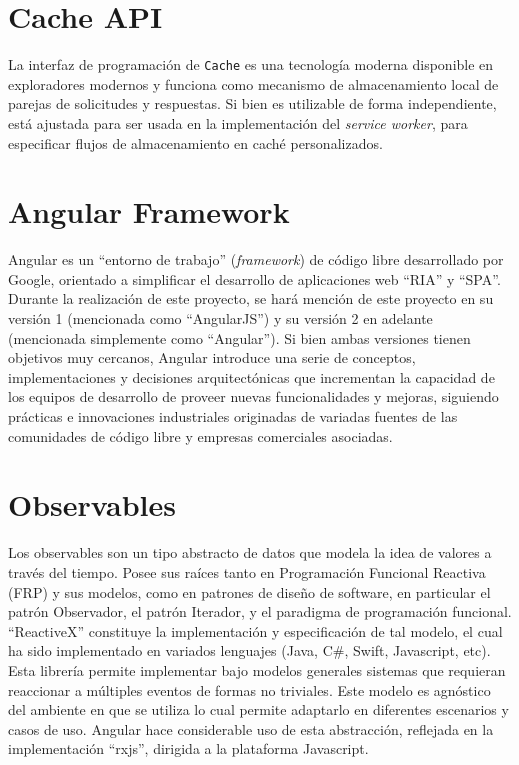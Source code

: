 \section{Cache API}

La interfaz de programación de \texttt{Cache} es una tecnología moderna disponible en exploradores modernos y funciona como mecanismo de almacenamiento local de parejas de solicitudes y respuestas. Si bien es utilizable de forma independiente, está ajustada para ser usada en la implementación del \textit{service worker}, para especificar flujos de almacenamiento en caché personalizados.

\section{Angular Framework}

Angular es un ``entorno de trabajo'' (\textit{framework}) de código libre desarrollado por Google, orientado a simplificar el desarrollo de aplicaciones web ``RIA'' y ``SPA''. Durante la realización de este proyecto, se hará mención de este proyecto en su versión 1 (mencionada como ``AngularJS'') y su versión 2 en adelante (mencionada simplemente como ``Angular''). Si bien ambas versiones tienen objetivos muy cercanos, Angular introduce una serie de conceptos, implementaciones y decisiones arquitectónicas que incrementan la capacidad de los equipos de desarrollo de proveer nuevas funcionalidades y mejoras, siguiendo prácticas e innovaciones industriales originadas de variadas fuentes de las comunidades de código libre y empresas comerciales asociadas.

\section{Observables}

Los observables son un tipo abstracto de datos que modela la idea de valores a través del tiempo. Posee sus raíces tanto en Programación Funcional Reactiva (FRP) y sus modelos, como en patrones de diseño de software, en particular el patrón Observador, el patrón Iterador, y el paradigma de programación funcional. ``ReactiveX'' constituye la implementación y especificación de tal modelo, el cual ha sido implementado en variados lenguajes (Java, C\#, Swift, Javascript, etc). Esta librería permite implementar bajo modelos generales sistemas que requieran reaccionar a múltiples eventos de formas no triviales. Este modelo es agnóstico del ambiente en que se utiliza lo cual permite adaptarlo en diferentes escenarios y casos de uso. Angular hace considerable uso de esta abstracción, reflejada en la implementación ``rxjs'', dirigida a la plataforma Javascript.

